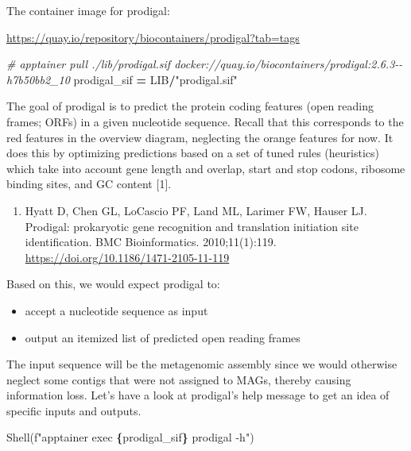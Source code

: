 \documentclass[
]{book}
\newenvironment{Shaded}{\begin{snugshade}}{\end{snugshade}}
\newcommand{\CommentTok}[1]{\textcolor[rgb]{0.56,0.35,0.01}{\textit{#1}}}
\newcommand{\NormalTok}[1]{#1}
\newcommand{\OperatorTok}[1]{\textcolor[rgb]{0.81,0.36,0.00}{\textbf{#1}}}
\newcommand{\SpecialCharTok}[1]{\textcolor[rgb]{0.81,0.36,0.00}{\textbf{#1}}}
\newcommand{\SpecialStringTok}[1]{\textcolor[rgb]{0.31,0.60,0.02}{#1}}
\newcommand{\StringTok}[1]{\textcolor[rgb]{0.31,0.60,0.02}{#1}}
\providecommand{\tightlist}{%
  \setlength{\itemsep}{0pt}\setlength{\parskip}{0pt}}
\begin{document}
The container image for prodigal:

\url{https://quay.io/repository/biocontainers/prodigal?tab=tags}

\begin{Shaded}
\begin{Highlighting}[numbers=left,,]
\CommentTok{\# apptainer pull ./lib/prodigal.sif docker://quay.io/biocontainers/prodigal:2.6.3{-}{-}h7b50bb2\_10}
\NormalTok{prodigal\_sif }\OperatorTok{=}\NormalTok{ LIB}\OperatorTok{/}\StringTok{"prodigal.sif"}
\end{Highlighting}
\end{Shaded}

The goal of prodigal is to predict the protein coding features (open reading frames; ORFs) in a given nucleotide sequence.
Recall that this corresponds to the red features in the overview diagram, neglecting the orange features for now.
It does this by optimizing predictions based on a set of tuned rules (heuristics) which take into account
gene length and overlap, start and stop codons, ribosome binding sites, and GC content {[}1{]}.

\begin{enumerate}
\def\labelenumi{\arabic{enumi}.}
\tightlist
\item
  Hyatt D, Chen GL, LoCascio PF, Land ML, Larimer FW, Hauser LJ. Prodigal: prokaryotic gene recognition and translation initiation site identification. BMC Bioinformatics. 2010;11(1):119. \url{https://doi.org/10.1186/1471-2105-11-119}
\end{enumerate}

Based on this, we would expect prodigal to:

\begin{itemize}
\tightlist
\item
  accept a nucleotide sequence as input
\item
  output an itemized list of predicted open reading frames
\end{itemize}

The input sequence will be the metagenomic assembly since we would otherwise neglect some contigs that were not assigned to MAGs,
thereby causing information loss.
Let's have a look at prodigal's help message to get an idea of specific inputs and outputs.

\begin{Shaded}
\begin{Highlighting}[numbers=left,,]
\NormalTok{Shell(}\SpecialStringTok{f"apptainer exec }\SpecialCharTok{\{}\NormalTok{prodigal\_sif}\SpecialCharTok{\}}\SpecialStringTok{ prodigal {-}h"}\NormalTok{)}
\end{Highlighting}
\end{Shaded}
\end{document}

